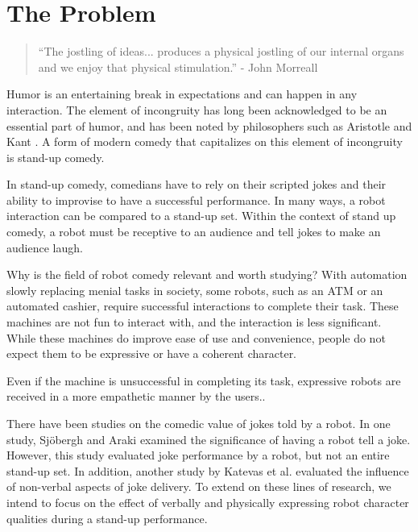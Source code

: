 \documentclass[onecolumn, draftclsnofoot,10pt, compsoc]{IEEEtran}
\begin{document}
\newpage
{}
\tableofcontents
\clearpage

\section{The Problem}

\begin{quote}
``The jostling of ideas... produces a physical jostling of our internal organs and we enjoy that physical stimulation.'' - John Morreall
\end{quote}
Humor is an entertaining break in expectations and can happen in any interaction. The element of incongruity has long been acknowledged to be an essential part of humor, and has been noted by philosophers such as Aristotle and Kant {\cite{StanfordHum:2016}}. A form of modern comedy that capitalizes on this element of incongruity is stand-up comedy.

In stand-up comedy, comedians have to rely on their scripted jokes and their ability to improvise to have a successful performance. In many ways, a robot interaction can be compared to a stand-up set. Within the context of stand up comedy, a robot must be receptive to an audience and tell jokes to make an audience laugh.

Why is the field of robot comedy relevant and worth studying? With automation slowly replacing menial tasks in society, some robots, such as an ATM or an automated cashier, require successful interactions to complete their task. These machines are not fun to interact with, and the interaction is less significant. While these machines do improve ease of use and convenience, people do not expect them to be expressive or have a coherent character.

Even if the machine is unsuccessful in completing its task, expressive robots are received in a more empathetic manner by the users.{\cite{DesignExBeh:2017}}.

There have been studies on the comedic value of jokes told by a robot. In one study, Sjöbergh and Araki {\cite{RobotsMakeThings:2008}} examined the significance of having a robot tell a joke. However, this study evaluated joke performance by a robot, but not an entire stand-up set. In addition, another study by Katevas et al. {\cite{RobotComedyLab:2015}} evaluated the influence of non-verbal aspects of joke delivery. To extend on these lines of research, we intend to focus on the effect of verbally and physically expressing robot character qualities during a stand-up performance.
\end{document}

